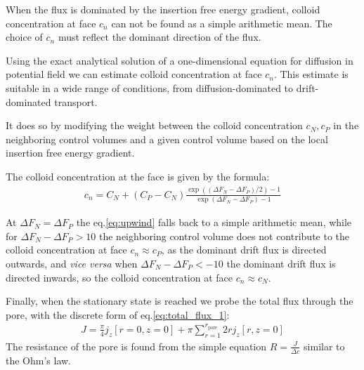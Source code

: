 \documentclass[10pt, a4paper]{article}
\begin{document}
\begin{multicols}{2}
When the flux is dominated by the insertion free energy gradient, colloid concentration at face $c_n$ can not be found as a simple arithmetic mean. 
The choice of $c_n$ must reflect the dominant direction of the flux.

Using the exact analytical solution of a one-dimensional equation for diffusion in potential field we can estimate colloid concentration at face $c_n$. 
This estimate is suitable in a wide range of conditions, from diffusion-dominated to drift-dominated transport.

It does so by modifying the weight between the colloid concentration $c_N, c_P$ in the neighboring control volumes and a given control volume based on the local insertion free energy gradient.

The colloid concentration at the face is given by the formula:
\begin{eqnarray}
    \label{eq:upwind}
    c_n = C_N + (C_P - C_N)\frac{\exp((\Delta F_N - \Delta F_P)/2)-1}{\exp(\Delta F_N - \Delta F_P) - 1}
\end{eqnarray}

At $\Delta F_N = \Delta F_P$ the eq.\ref{eq:upwind} falls back to a simple arithmetic mean, while for $\Delta F_N - \Delta F_P>10$ the neighboring control volume does not contribute to the colloid concentration at face $c_n \approx c_P$, as the dominant drift flux is directed outwards, and \emph{vice versa} when $\Delta F_N - \Delta F_P< -10$ the dominant drift flux is directed inwards, so the colloid concentration at face $c_n \approx c_N$.


Finally, when the stationary state is reached we probe the total flux through the pore, with the discrete form of eq.\ref{eq:total_flux_1}:
\begin{eqnarray}
    \label{eq:total_flux_2}
    J = \frac{\pi}{4} j_z[r=0,z=0] + \pi \sum_{r=1}^{r_\textrm{pore}} 2r  j_z[r,z=0]
\end{eqnarray}
The resistance of the pore is found from the simple equation $R = \frac{J}{\Delta c}$ similar to the Ohm's law.


\end{multicols}
\end{document}
